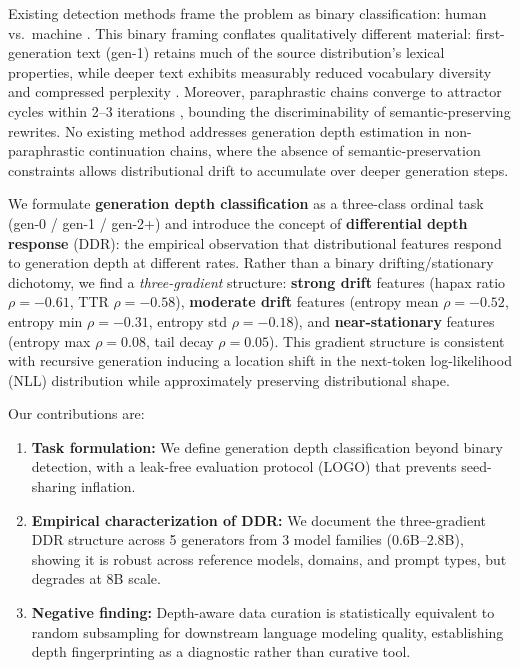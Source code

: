 \documentclass[11pt,a4paper]{article}
\begin{document}
Existing detection methods frame the problem as binary classification: human vs.\ machine \cite{mitchell2023detectgpt,hans2024binoculars,bao2024fastdetectgpt}.
This binary framing conflates qualitatively different material: first-generation text (gen-1) retains much of the source distribution's lexical properties, while deeper text exhibits measurably reduced vocabulary diversity and compressed perplexity \cite{briesch2023large,guo2024curious}.
Moreover, paraphrastic chains converge to attractor cycles within 2--3 iterations \cite{chen2025llm}, bounding the discriminability of semantic-preserving rewrites.
No existing method addresses generation depth estimation in non-paraphrastic continuation chains, where the absence of semantic-preservation constraints allows distributional drift to accumulate over deeper generation steps.

We formulate \textbf{generation depth classification} as a three-class ordinal task (gen-0 / gen-1 / gen-2+) and introduce the concept of \textbf{differential depth response} (DDR): the empirical observation that distributional features respond to generation depth at different rates.
Rather than a binary drifting/stationary dichotomy, we find a \emph{three-gradient} structure: \textbf{strong drift} features (hapax ratio $\rho = {-}0.61$, TTR $\rho = {-}0.58$), \textbf{moderate drift} features (entropy mean $\rho = {-}0.52$, entropy min $\rho = {-}0.31$, entropy std $\rho = {-}0.18$), and \textbf{near-stationary} features (entropy max $\rho = 0.08$, tail decay $\rho = 0.05$).
This gradient structure is consistent with recursive generation inducing a location shift in the next-token log-likelihood (NLL) distribution while approximately preserving distributional shape.

Our contributions are:
\begin{enumerate}[nosep,leftmargin=*]
  \item \textbf{Task formulation:} We define generation depth classification beyond binary detection, with a leak-free evaluation protocol (LOGO) that prevents seed-sharing inflation.
  \item \textbf{Empirical characterization of DDR:} We document the three-gradient DDR structure across 5 generators from 3 model families (0.6B--2.8B), showing it is robust across reference models, domains, and prompt types, but degrades at 8B scale.
  \item \textbf{Negative finding:} Depth-aware data curation is statistically equivalent to random subsampling for downstream language modeling quality, establishing depth fingerprinting as a diagnostic rather than curative tool.
\end{enumerate}
\end{document}
